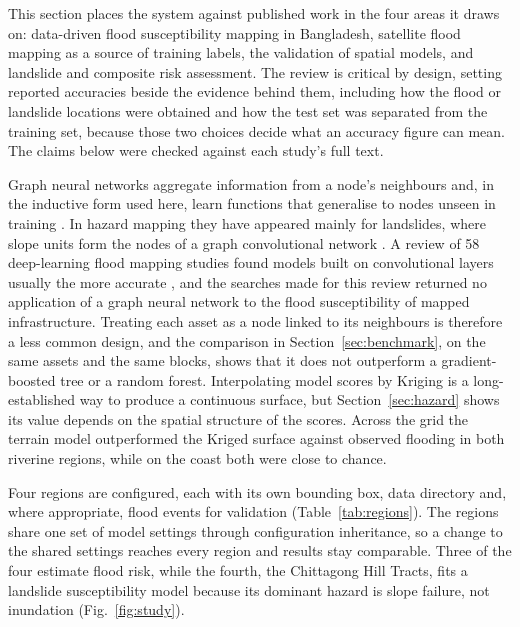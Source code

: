 {This section places the system against published work in the four areas it draws on: data-driven flood susceptibility mapping in Bangladesh, satellite flood mapping as a source of training labels, the validation of spatial models, and landslide and composite risk assessment. The review is critical by design, setting reported accuracies beside the evidence behind them, including how the flood or landslide locations were obtained and how the test set was separated from the training set, because those two choices decide what an accuracy figure can mean. The claims below were checked against each study's full text.

Graph neural networks aggregate information from a node's neighbours and, in the inductive form used here, learn functions that generalise to nodes unseen in training \citep{hamilton2017}. In hazard mapping they have appeared mainly for landslides, where slope units form the nodes of a graph convolutional network \citep{wang2023, ma2025}. A review of 58 deep-learning flood mapping studies found models built on convolutional layers usually the more accurate \citep{bentivoglio2022}, and the searches made for this review returned no application of a graph neural network to the flood susceptibility of mapped infrastructure. Treating each asset as a node linked to its neighbours is therefore a less common design, and the comparison in Section~\ref{sec:benchmark}, on the same assets and the same blocks, shows that it does not outperform a gradient-boosted tree or a random forest. Interpolating model scores by Kriging is a long-established way to produce a continuous surface, but Section~\ref{sec:hazard} shows its value depends on the spatial structure of the scores. Across the grid the terrain model outperformed the Kriged surface against observed flooding in both riverine regions, while on the coast both were close to chance.

Four regions are configured, each with its own bounding box, data directory and, where appropriate, flood events for validation (Table~\ref{tab:regions}). The regions share one set of model settings through configuration inheritance, so a change to the shared settings reaches every region and results stay comparable. Three of the four estimate flood risk, while the fourth, the Chittagong Hill Tracts, fits a landslide susceptibility model because its dominant hazard is slope failure, not inundation (Fig.~\ref{fig:study}).

\caption{The four study regions, drawn as their configured bounding boxes over the district boundaries of geoBoundaries and tinted inside Bangladesh, blue for the three flood regions and orange for the landslide region. Neighbouring countries are from Natural Earth.}

}
